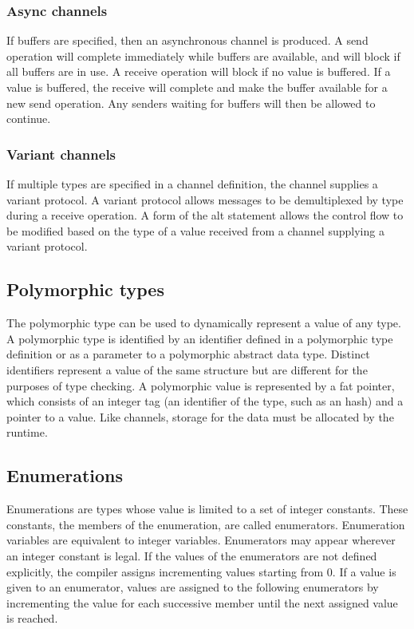 \hypertarget{async-channels}{%
\subsubsection{Async channels}\label{async-channels}}

If buffers are specified, then an asynchronous channel is produced. A
send operation will complete immediately while buffers are available,
and will block if all buffers are in use. A receive operation will block
if no value is buffered. If a value is buffered, the receive will
complete and make the buffer available for a new send operation. Any
senders waiting for buffers will then be allowed to continue.

\hypertarget{variant-channels}{%
\subsubsection{Variant channels}\label{variant-channels}}

If multiple types are specified in a channel definition, the channel
supplies a variant protocol. A variant protocol allows messages to be
demultiplexed by type during a receive operation. A form of the alt
statement allows the control flow to be modified based on the type of a
value received from a channel supplying a variant protocol.

\hypertarget{polymorphic-types}{%
\subsection{Polymorphic types}\label{polymorphic-types}}

The polymorphic type can be used to dynamically represent a value of any
type. A polymorphic type is identified by an identifier defined in a
polymorphic type definition or as a parameter to a polymorphic abstract
data type. Distinct identifiers represent a value of the same structure
but are different for the purposes of type checking. A polymorphic value
is represented by a fat pointer, which consists of an integer tag (an
identifier of the type, such as an hash) and a pointer to a value. Like
channels, storage for the data must be allocated by the runtime.

\hypertarget{enumerations}{%
\subsection{Enumerations}\label{enumerations}}

Enumerations are types whose value is limited to a set of integer
constants. These constants, the members of the enumeration, are called
enumerators. Enumeration variables are equivalent to integer variables.
Enumerators may appear wherever an integer constant is legal. If the
values of the enumerators are not defined explicitly, the compiler
assigns incrementing values starting from 0. If a value is given to an
enumerator, values are assigned to the following enumerators by
incrementing the value for each successive member until the next
assigned value is reached.

